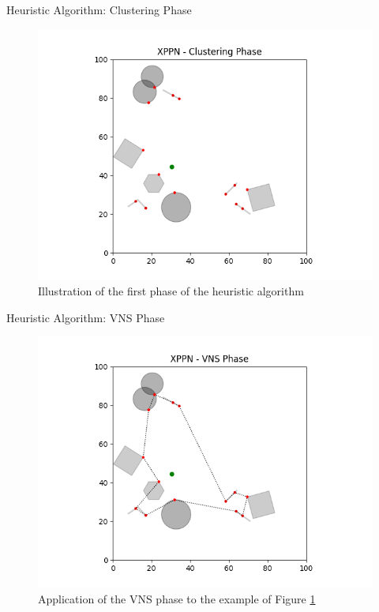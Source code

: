 \documentclass[slidestop,usepdftitle=false,10pt]{beamer}
\begin{document}
	\begin{frame}{Heuristic Algorithm: Clustering Phase}
        \begin{figure}[ht!]
        \begin{center}
         \includegraphics[width=0.7\linewidth]{XPPN - Clustering Phase}
        \end{center}
        \caption{Illustration of the first phase of the heuristic algorithm} \label{fig:heur-1}
        \end{figure}
	\end{frame}


	\begin{frame}{Heuristic Algorithm: VNS Phase}
        \begin{figure}[ht!]
        \begin{center}
         \includegraphics[width=0.7\linewidth]{XPPN - VNS Phase}
        \end{center}
        \caption{Application of the VNS phase to the example of Figure \ref{fig:heur-1} \label{fig:heur-2}}
        \end{figure}
	\end{frame}
	
\end{document}
